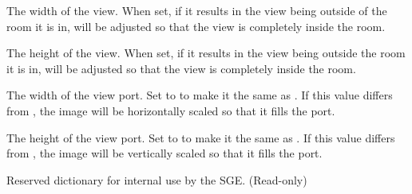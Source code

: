 \documentclass[letterpaper,10pt,english]{sphinxmanual}
\begin{document}
\begin{fulllineitems}

\begin{fulllineitems}
\label{dsp:sge.dsp.View.width}
The width of the view.  When set, if it results in the view being
outside of the room it is in, {\hyperref[dsp:sge.dsp.View.x]{\emph{}}} will be adjusted so that
the view is completely inside the room.

\end{fulllineitems}


\begin{fulllineitems}
\label{dsp:sge.dsp.View.height}
The height of the view.  When set, if it results in the view
being outside the room it is in, {\hyperref[dsp:sge.dsp.View.y]{\emph{}}} will be adjusted so
that the view is completely inside the room.

\end{fulllineitems}


\begin{fulllineitems}
\label{dsp:sge.dsp.View.wport}
The width of the view port.  Set to  to make it the
same as {\hyperref[dsp:sge.dsp.View.width]{\emph{}}}.  If this value differs from {\hyperref[dsp:sge.dsp.View.width]{\emph{}}},
the image will be horizontally scaled so that it fills the port.

\end{fulllineitems}


\begin{fulllineitems}
\label{dsp:sge.dsp.View.hport}
The height of the view port.  Set to  to make it the
same as {\hyperref[dsp:sge.dsp.View.height]{\emph{}}}.  If this value differs from
{\hyperref[dsp:sge.dsp.View.height]{\emph{}}}, the image will be vertically scaled so that it
fills the port.

\end{fulllineitems}


\begin{fulllineitems}
\label{dsp:sge.dsp.View.rd}
Reserved dictionary for internal use by the SGE.  (Read-only)

\end{fulllineitems}


\end{fulllineitems}
\end{document}
